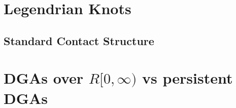 \documentclass[11pt,letterpaper]{amsart}%
\begin{document}
\tableofcontents
\section{Legendrian Knots}

\subsection{Standard Contact Structure}

\section{DGAs over $R[0,\infty)$ vs persistent DGAs}
\end{document}
